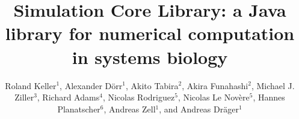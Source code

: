 \documentclass[10pt]{bmc_article}
\newenvironment{bmcformat}{\baselineskip20pt\sloppy\setboolean{publ}{false}}{\baselineskip20pt\sloppy}
\begin{document}
\begin{bmcformat}



\title{Simulation Core Library: a Java
library for numerical computation in systems biology}
 


\author{%
Roland Keller$^{1}$\correspondingauthor{}, 
Alexander D\"orr$^{1}$\correspondingauthor{},  
Akito Tabira$^{2}$, %
Akira Funahashi$^{2}$, %
Michael J. Ziller$^{3}$, %
Richard Adams$^{4}$, %
Nicolas Rodriguez$^{5}$, %
Nicolas Le Nov\`{e}re$^{5}$, %
Hannes Planatscher$^{6}$, %
Andreas Zell$^{1}$, %
and Andreas Dr\"ager$^{1}$\correspondingauthor{}%
}


\address{%
\iid(1)Center for Bioinformatics Tuebingen (ZBIT), University of
Tuebingen, T\"ubingen, Germany
\iid(2)Keio University, Graduate School of
Science and Technology, Yokohama, Japan 
\iid(3)Department of Stem Cell and Regenerative Biology, Harvard University,
Cambridge, MA, USA
\iid(4)SynthSys Edinburgh, CH Waddington Building, University of Edinburgh,
Edinburgh EH9 3JD, UK
\iid(5)European Bioinformatics Institute, Wellcome Trust Genome Campus, Hinxton,
Cambridge, UK
\iid(6)Natural and Medical Sciences Institute at the University of Tuebingen,
Reutlingen, Germany}


\end{bmcformat}
\end{document}

